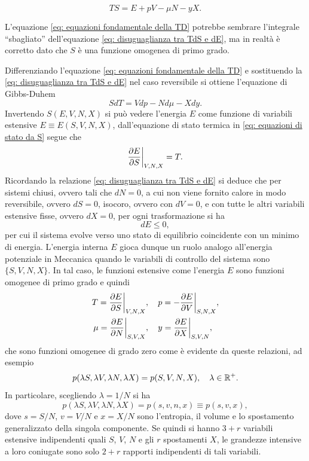 \begin{equation}
\label{eq: equazioni fondamentale della TD}
    TS = E + pV - \mu N - yX.
\end{equation}
\begin{obs}
    L'equazione \eqref{eq: equazioni fondamentale della TD} potrebbe sembrare l'integrale ``sbagliato'' dell'equazione \eqref{eq: disuguaglianza tra TdS e dE}, ma in realtà è corretto dato che $S$ è una funzione omogenea di primo grado.    
\end{obs}
Differenziando l'equazione \eqref{eq: equazioni fondamentale della TD} e sostituendo la \eqref{eq: disuguaglianza tra TdS e dE} nel caso reversibile si ottiene l'equazione di Gibbs-Duhem
\begin{equation}
\label{eq: equazione di Gibbs-Duhem}
    SdT = Vdp - Nd\mu - Xdy.
\end{equation}
Invertendo $S(E,V,N,X)$ si può vedere l'energia $E$ come funzione di variabili estensive $E\equiv E(S,V,N,X)$, dall'equazione di stato termica in \eqref{eq: equazioni di stato da S} segue che
\begin{equation}
    \frac{\partial E}{\partial S}\bigg|_{V,N,X}=T.
\end{equation}
Ricordando la relazione \eqref{eq: disuguaglianza tra TdS e dE} si deduce che per sistemi chiusi, ovvero tali che $dN = 0$, a cui non viene fornito calore in modo reversibile, ovvero $dS = 0$, isocoro, ovvero con $dV = 0$, e con tutte le altri variabili estensive fisse, ovvero $dX = 0$, per ogni trasformazione si ha 
\begin{equation}
    dE \le 0,
\end{equation}
per cui il sistema evolve verso uno stato di equilibrio coincidente con un minimo di energia. L'energia interna $E$ gioca dunque un ruolo analogo all'energia potenziale in Meccanica quando le variabili di controllo del sistema sono $\{S,V,N,X\}$. In tal caso, le funzioni estensive come l'energia $E$ sono funzioni omogenee di primo grado e quindi
\begin{equation}
\label{eq: equazioni di stato da E}
    \begin{split}
         T=\frac{\partial E}{\partial S}\bigg|_{V,N,X}&,\quad p=-\frac{\partial E}{\partial V}\bigg|_{S,N,X}, \\
         \mu=\frac{\partial E}{\partial N}\bigg|_{S,V,X}&,\quad y=\frac{\partial E}{\partial X}\bigg|_{S,V,N},
    \end{split}
\end{equation}
che sono funzioni omogenee di grado zero come è evidente da queste relazioni, ad esempio
\begin{equation}
    p(\lambda S,\lambda V,\lambda N,\lambda X) = p(S,V,N,X),\quad\lambda\in\mathbb{R}^+.
\end{equation}
In particolare, scegliendo $\lambda = 1/N$ si ha 
\begin{equation}
    p(\lambda S,\lambda V,\lambda N,\lambda X) = p(s,v,n,x) \equiv p(s,v,x),
\end{equation}
dove $s = S/N$, $v = V/N$ e $x = X/N$ sono l'entropia, il volume e lo spostamento generalizzato della singola componente. Se quindi si hanno $3 + r$ variabili estensive indipendenti quali $S$, $V$, $N$ e gli $r$ spostamenti $X$, le grandezze intensive a loro coniugate sono solo $2 + r$ rapporti indipendenti di tali variabili.

